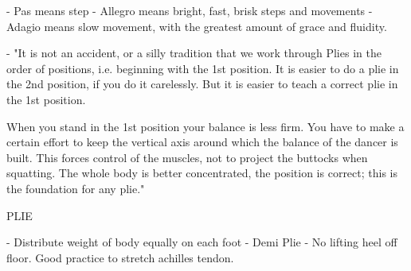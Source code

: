 - Pas means step
- Allegro means bright, fast, brisk steps and movements
- Adagio means slow movement, with the greatest amount of grace and fluidity.

- "It is not an accident, or a silly tradition that we work through Plies in the order of positions, i.e. beginning with the 1st position. It is easier to do a plie in the 2nd position, if you do it carelessly. But it is easier to teach a correct plie in the 1st position.

	When you stand in the 1st position your balance is less firm. You have to make a certain effort to keep the vertical axis around which the balance of the dancer is built. This forces control of the muscles, not to project the buttocks when squatting. The whole body is better concentrated, the position is correct; this is the foundation for any plie."

PLIE

- Distribute weight of body equally on each foot
- Demi Plie - No lifting heel off floor. Good practice to stretch achilles tendon.